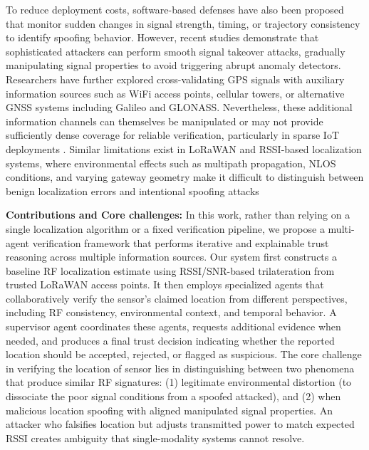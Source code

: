 \documentclass[10pt, twocolumn, letterpaper]{article}
\begin{document}
To reduce deployment costs, software-based defenses have also been proposed that monitor sudden changes in signal strength, timing, or trajectory consistency to identify spoofing behavior. However, recent studies demonstrate that sophisticated attackers can perform smooth signal takeover attacks, gradually manipulating signal properties to avoid triggering abrupt anomaly detectors. Researchers have further explored cross-validating GPS signals with auxiliary information sources such as WiFi access points, cellular towers, or alternative GNSS systems including Galileo and GLONASS. Nevertheless, these additional information channels can themselves be manipulated or may not provide sufficiently dense coverage for reliable verification, particularly in sparse IoT deployments \cite{shinan}. Similar limitations exist in LoRaWAN and RSSI-based localization systems, where environmental effects such as multipath propagation, NLOS conditions, and varying gateway geometry make it difficult to distinguish between benign localization errors and intentional spoofing attacks \cite{iotdi1}




\textbf{Contributions and Core challenges:} In this work, rather than relying on a single localization algorithm or a fixed verification pipeline, we propose a multi-agent verification framework that performs iterative and explainable trust reasoning across multiple information sources. Our system first constructs a baseline RF localization estimate using RSSI/SNR-based trilateration from trusted LoRaWAN access points. It then employs specialized agents that collaboratively verify the sensor’s claimed location from different perspectives, including RF consistency, environmental context, and temporal behavior. A supervisor agent coordinates these agents, requests additional evidence when needed, and produces a final trust decision indicating whether the reported location should be accepted, rejected, or flagged as suspicious. The core challenge in verifying the location of sensor lies in distinguishing between two phenomena that produce similar RF signatures: (1) legitimate environmental distortion (to dissociate the poor signal conditions from a spoofed attacked), and (2) when malicious location spoofing with aligned manipulated signal properties. An attacker who falsifies location but adjusts transmitted power to match expected RSSI creates ambiguity that single-modality systems cannot resolve.
\end{document}
